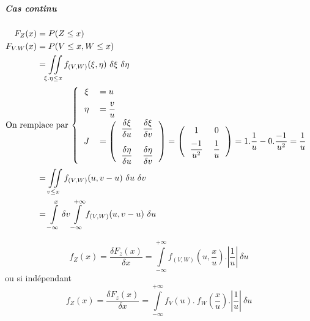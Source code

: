\subparagraph{Cas continu}
\begin{align*}
	F_Z(x)     &= P(Z \leq x)\\
	F_{V.W}(x) &= P(V \leq x, W \leq x) \\
	           &= \iint\limits_{\xi . \eta\leq x} f_{(V,W)}(\xi,\eta)\ \delta\xi\ \delta\eta\\
	\intertext{On remplace par $\left\{
		\begin{tabular}{cl}
			$\xi$  & $= u$\\[0.2cm]
			$\eta$ & $= \dfrac{v}{u}$\\[0.2cm]
			$J$    & $= \left(\begin{tabular}{cc}$\dfrac{\delta\xi}{\delta u}$&$\dfrac{\delta \xi}{\delta v}$\\[0.5cm]$\dfrac{\delta\eta}{\delta u}$&$\dfrac{\delta\eta}{\delta v}$\end{tabular}\right) = \left(\begin{tabular}{cc}1&0\\[0.2cm]$\dfrac{-1}{u^2}$&$\dfrac{1}{u}$\end{tabular}\right) = 1.\dfrac{1}{u} - 0.\dfrac{-1}{u^2} = \dfrac{1}{u}$
		\end{tabular}
		\right.$}
	&= \iint\limits_{v\leq x} f_{(V,W)}(u,v-u)\ \delta u\ \delta v\\
	&= \int\limits_{-\infty}^x\delta v \int\limits_{-\infty}^{+\infty} f_{(V,W)}(u,v-u)\ \delta u
\end{align*}

$$\boxed{f_Z(x) = \frac{\delta F_z(x)}{\delta x} = \int\limits_{-\infty}^{+\infty} f_{(V,W)}\left(u,\dfrac{x}{u}\right).\left|\dfrac{1}{u}\right|\ \delta u }$$
ou si indépendant
$$\boxed{f_Z(x) = \frac{\delta F_z(x)}{\delta x} = \int\limits_{-\infty}^{+\infty} f_V\left(u\right).\ f_W\left(\dfrac{x}{u}\right).\left|\dfrac{1}{u}\right|\ \delta u }$$
